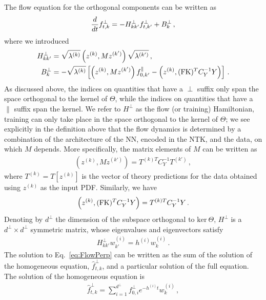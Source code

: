 The flow equation for the orthogonal components can be written as
\begin{align}
    \label{eq:FlowPerp}
    \frac{d}{dt} f^\perp_{t,k} = - H^\perp_{kk'} f^\perp_{t,k'}
        + B^\perp_{k}\, ,
\end{align}
where  we introduced
\begin{align}
    H^\perp_{kk'} &= \sqrt{\lambda^{(k)}} \left(z^{(k)}, M z^{(k')}\right) \sqrt{\lambda^{(k')}}\, ,\\
    B^\perp_k &= -\sqrt{\lambda^{(k)}} \left[\left(z^{(k)}, M z^{(k')}\right) f^\parallel_{0,k'}
        - \left(z^{(k)}, (\mathrm{FK})^T C_Y^{-1} Y\right)\right]\, .
\end{align}
As discussed above, the indices on quantities that have a $\perp$ suffix only span the space
orthogonal to the kernel of $\Theta$, while the indices on quantities that have
a $\parallel$ suffix span the kernel. We refer to $H^\perp$ as the flow (or
training) Hamiltonian, training can only take place in the space orthogonal
to the kernel of $\Theta$; we see explicitly in the definition above that the flow
dynamics is determined by a combination of the architecture of the NN, encoded
in the NTK, and the data, on which $M$ depends. More specifically, the matrix
elements of $M$ can be written as
\begin{align}
    \label{eq:MMatElems}
    \left(z^{(k)}, M z^{(k')}\right) = T^{(k)T} C_Y^{-1} T^{(k')}\, ,
\end{align}
where $T^{(k)} = T[z^{(k)}]$ is the vector of theory predictions for the data
obtained using $z^{(k)}$ as the input PDF. Similarly, we have
\begin{align}
    \label{eq:BMatElems}
    \left(z^{(k)}, (\mathrm{FK})^T C_Y^{-1} Y\right) = T^{(k)T} C_Y^{-1} Y\, .
\end{align}
Denoting by $d^\perp$ the dimension of the subspace orthogonal to $\text{ker}\
\Theta$, $H^\perp$ is a $d^\perp\times d^\perp$ symmetric matrix, whose
eigenvalues and eigenvectors satisfy
\begin{align}
    H^\perp_{kk'} w^{(i)}_{k'} = h^{(i)} w^{(i)}_{k}\, .
\end{align}
The solution to Eq.~\eqref{eq:FlowPerp} can be written as the sum of the
solution of the homogeneous equation, $\hat{f}^{\perp}_{t,k}$, and a particular
solution of the full equation. The solution of the homogeneous equation is
\begin{align}
    \label{eq:HomoSoln}
    \hat{f}^{\perp}_{t,k} = \sum_{i=1}^{d^\perp} f^{\perp}_{0,i} e^{-h^{(i)}t} w^{(i)}_k\, ,
\end{align}
